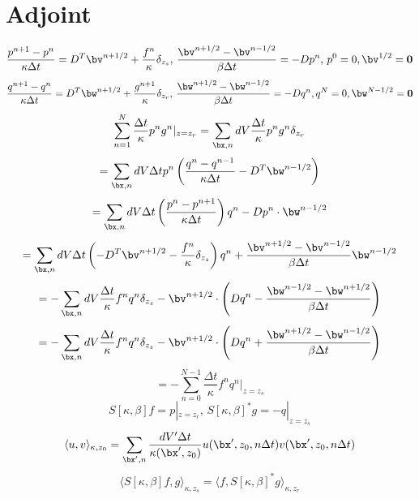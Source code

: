 \section{Adjoint}
\begin{equation}
\label{eqn:dfwd1d}
\frac{p^{n+1}-p^n}{\kappa\Delta t} = D^T \bv^{n+1/2} + \frac{f^n}{\kappa} \delta_{z_s},\,\frac{\bv^{n+1/2}-\bv^{n-1/2}}{\beta \Delta t} = - Dp^n,\, p^0=0, \bv^{1/2}=\bf{0}
\end{equation}
\begin{equation}
\label{eqn:dadj1d}
\frac{q^{n+1}-q^n}{\kappa \Delta t} = D^T \bw^{n+1/2} + \frac{g^{n+1}}{\kappa} \delta_{z_r},\,\frac{\bw^{n+1/2}-\bw^{n-1/2}}{\beta \Delta t} = - Dq^n, q^N=0, \bw^{N-1/2}=\bf{0}
\end{equation}
\[
\sum^N_{n=1} \frac{\Delta t}{\kappa} p^n g^n|_{z=z_r} = \sum_{\bx,n} dV \frac{\Delta t}{\kappa} p^n g^n \delta_{z_r}
\]
\[
= \sum_{\bx,n} dV \Delta t p^n\left(\frac{q^{n}-q^{n-1}}{\kappa\Delta t} -D^T \bw^{n-1/2}\right)
\]
\[
= \sum_{\bx,n} dV \Delta t \left(\frac{p^{n}-p^{n+1}}{\kappa\Delta t}\right)q^n - D p^n \cdot \bw^{n-1/2}
\]
\[
= \sum_{\bx,n} dV \Delta t \left(-D^T\bv^{n+1/2} - \frac{f^n}{\kappa}\delta_{z_s}\right)q^n + \frac{\bv^{n+1/2}-\bv^{n-1/2}}{\beta \Delta t}\bw^{n-1/2}
\]
\[
=-\sum_{\bx,n} dV \frac{\Delta t}{\kappa} f^nq^n \delta_{z_s} 
-\bv^{n+1/2} \cdot \left(D q^n - \frac{\bw^{n-1/2}-\bw^{n+1/2}}{\beta \Delta t} \right) 
\]
\[
=-\sum_{\bx,n} dV \frac{\Delta t}{\kappa} f^nq^n \delta_{z_s} 
-\bv^{n+1/2}\cdot  \left(D q^n + \frac{\bw^{n+1/2}-\bw^{n-1/2}}{\beta \Delta t} \right) 
\]
\begin{equation}
\label{eqn:adjreln}
=-\sum^{N-1}_{n=0} \frac{\Delta t}{\kappa} f^nq^n|_{z=z_s}
\end{equation}
\begin{equation}
\label{eqn:opdef}
S[\kappa,\beta]f = p|_{z=z_r}, \,S[\kappa,\beta]^*g = -q|_{z=z_s}
\end{equation}
\begin{equation}
\label{eqn:ipdef}
\langle u, v \rangle_{\kappa,z_0} = \sum_{\bx',n} \frac{dV' \Delta t}{\kappa(\bx',z_0)} u(\bx',z_0,n\Delta t) v(\bx',z_0,n\Delta t)
\end{equation}
\begin{equation}
\langle S[\kappa,\beta]f, g \rangle_{\kappa,z_s} = \langle f, S[\kappa,\beta]^*g \rangle_{\kappa,z_r}
\end{equation}



